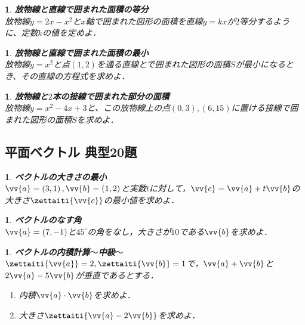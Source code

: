 \documentclass[10pt,
fleqn,
dvipdfmx,
uplatex
]{jsarticle}
\newtheorem{question}[Question]{}
\begin{document}
\begin{question}{\bf\boldmath 放物線と直線で囲まれた面積の等分}\\
放物線$y=2x-x^2$と$x$軸で囲まれた図形の面積を直線$y=kx$が$2$等分するように、定数$k$の値を定めよ．
\end{question}



\begin{question}{\bf\boldmath 放物線と直線で囲まれた面積の最小}\\
放物線$y=x^2$と点$\left(1,2\right)$を通る直線とで囲まれた図形の面積$S$が最小になるとき、その直線の方程式を求めよ．
\end{question}



\begin{question}{\bf\boldmath 放物線と$2$本の接線で囲まれた部分の面積}\\
放物線$y=x^2-4x+3$と、この放物線上の点$\left(0,3\right),\left(6,{15}\right)$に置ける接線で囲まれた図形の面積$S$を求めよ．
\end{question}

\subsection{平面ベクトル 典型20題}



\begin{question}{\bf\boldmath ベクトルの大きさの最小}\\
$\vv {a}=\left(3, 1\right), \vv {b}=\left(1, 2\right)$と実数$t$に対して，$\vv {c}=\vv {a}+t\vv {b}$の大きさ$\zettaiti{\vv {c}}$の最小値を求めよ．
\end{question}



\begin{question}{\bf\boldmath ベクトルのなす角}\\
$\vv {a}=\left(7, -1\right)$と${45}^\circ$の角をなし，大きさが${10}$である$\vv {b}$を求めよ．
\end{question}



\begin{question}{\bf\boldmath ベクトルの内積計算$〜$中級$〜$}\\
$\zettaiti{\vv {a}}=2, \zettaiti{\vv {b}}=1$で，$\vv {a}+\vv {b}$と$2\vv {a}-5\vv {b}$が垂直であるとする．
\begin{enumerate}
\item 内積$\vv {a}\cdot \vv {b}$を求めよ．
\item 大きさ$\zettaiti{\vv {a}-2\vv {b}}$を求めよ．
\end{enumerate}

\end{question}
\end{document}
